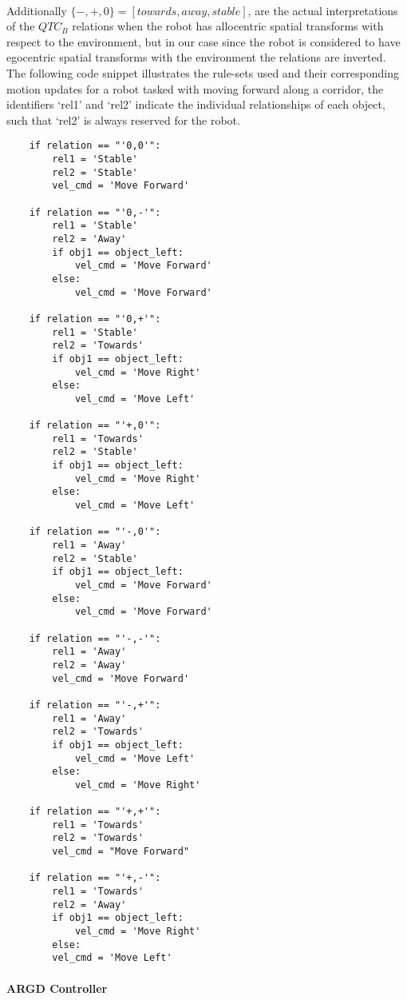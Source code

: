 \paragraph{}Additionally $\{-,+,0\} = [towards, away, stable]$, are the actual interpretations of the $QTC_B$ relations when the robot has allocentric spatial transforms with respect to the environment, but in our case since the robot is considered to have egocentric spatial transforms with the environment the relations are inverted. The following code snippet illustrates the rule-sets used and their corresponding motion updates for a robot tasked with moving forward along a corridor, the identifiers `rel1' and `rel2' indicate the individual relationships of each object, such that `rel2' is always reserved for the robot.

\begin{verbatim}
	if relation == "'0,0'":
		rel1 = 'Stable'
		rel2 = 'Stable'
		vel_cmd = 'Move Forward'
	
	if relation == "'0,-'":
		rel1 = 'Stable'
		rel2 = 'Away'
		if obj1 == object_left:
			vel_cmd = 'Move Forward'
		else:
			vel_cmd = 'Move Forward'
	
	if relation == "'0,+'":
		rel1 = 'Stable'
		rel2 = 'Towards'
		if obj1 == object_left:
			vel_cmd = 'Move Right'
		else:
			vel_cmd = 'Move Left'
	
	if relation == "'+,0'":
		rel1 = 'Towards'
		rel2 = 'Stable'
		if obj1 == object_left:
			vel_cmd = 'Move Right'
		else:
			vel_cmd = 'Move Left'
	
	if relation == "'-,0'":
		rel1 = 'Away'
		rel2 = 'Stable'
		if obj1 == object_left:
			vel_cmd = 'Move Forward'
		else:
			vel_cmd = 'Move Forward'
	
	if relation == "'-,-'":
		rel1 = 'Away'
		rel2 = 'Away'
		vel_cmd = 'Move Forward'
	
	if relation == "'-,+'":
		rel1 = 'Away'
		rel2 = 'Towards'
		if obj1 == object_left:
			vel_cmd = 'Move Left'
		else:
			vel_cmd = 'Move Right'
	
	if relation == "'+,+'":
		rel1 = 'Towards'
		rel2 = 'Towards'
		vel_cmd = "Move Forward" 
	
	if relation == "'+,-'":
		rel1 = 'Towards'
		rel2 = 'Away'
		if obj1 == object_left:
			vel_cmd = 'Move Right'
		else:
		vel_cmd = 'Move Left'
\end{verbatim}

\paragraph{ARGD Controller}
